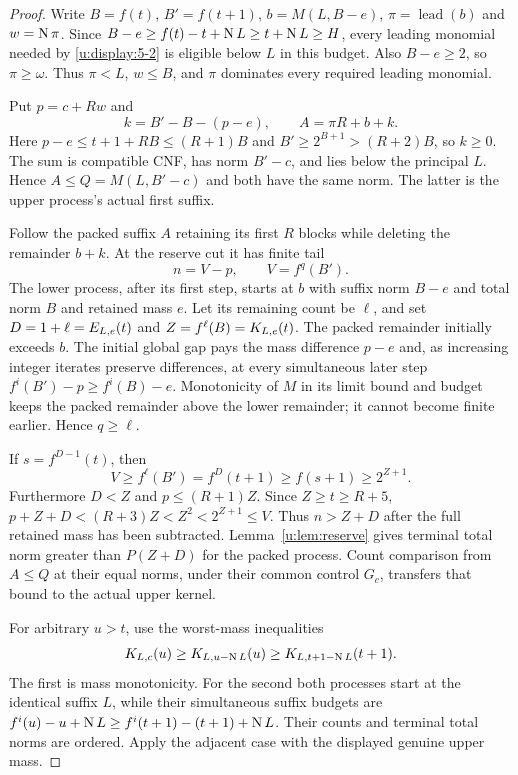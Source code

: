 \begin{proof}
Write $B=f(t)$, $B'=f(t+1)$, $b=M(L,B-e)$,
$\pi=\operatorname{lead}(b)$ and $w=\operatorname{N}\pi$. Since
$B-e\ge f(t)-t+\operatorname{N} L\ge t+\operatorname{N} L\ge H$, every leading monomial
needed by \eqref{u:display:5-2} is eligible below $L$ in this budget. Also $B-e\ge2$,
so $\pi\ge\omega$. Thus $\pi<L$, $w\le B$, and $\pi$ dominates
every required leading monomial.

Put $p=c+Rw$ and
\[
 k=B'-B-(p-e),\qquad A=\pi R+b+k.
\]
Here $p-e\le t+1+RB\le(R+1)B$ and
$B'\ge2^{B+1}>(R+2)B$, so $k\ge0$. The sum is compatible CNF,
has norm $B'-c$, and lies below the principal $L$. Hence
$A\le Q=M(L,B'-c)$ and both have the same norm. The latter is the
upper process's actual first suffix.

Follow the packed suffix $A$ retaining its first $R$ blocks while deleting
the remainder $b+k$. At the reserve cut it has finite tail
\begin{equation}
               n=V-p,\qquad V=f^q(B').              \label{u:display:6-3}
\end{equation}
The lower process, after its first step, starts at $b$ with suffix norm $B-e$ and total norm $B$
and retained mass $e$. Let its remaining count be $\ell$, and set
$D=1+\ell=E_{L,e}(t)$ and $Z=f^\ell(B)=K_{L,e}(t)$.
The packed remainder initially exceeds $b$. The initial global gap pays
the mass difference $p-e$ and, as increasing integer iterates preserve
differences, at every simultaneous later step
$f^i(B')-p\ge f^i(B)-e$. Monotonicity of $M$ in its limit bound and
budget keeps the packed remainder above the lower remainder; it cannot
become finite earlier. Hence $q\ge\ell$.

If $s=f^{D-1}(t)$, then
\[
 V\ge f^\ell(B')=f^D(t+1)\ge f(s+1)\ge2^{Z+1}.
\]
Furthermore $D<Z$ and $p\le(R+1)Z$. Since $Z\ge t\ge R+5$,
$p+Z+D<(R+3)Z<Z^2<2^{Z+1}\le V$. Thus $n>Z+D$ after the full
retained mass has been subtracted. Lemma~\ref{u:lem:reserve} gives terminal
total norm greater than $P(Z+D)$ for the packed process. Count comparison
from $A\le Q$ at their equal norms, under their common control $G_c$,
transfers that bound to the actual upper kernel.

For arbitrary $u>t$, use the worst-mass inequalities
\begin{equation}
 K_{L,c}(u)\ge K_{L,u-\operatorname{N} L}(u)
          \ge K_{L,t+1-\operatorname{N} L}(t+1).              \label{u:display:6-4}
\end{equation}
The first is mass monotonicity. For the second both processes start at
the identical suffix $L$, while their simultaneous suffix budgets are
$f^i(u)-u+\operatorname{N} L\ge f^i(t+1)-(t+1)+\operatorname{N} L$.
Their counts and terminal total norms are ordered. Apply the adjacent
case with the displayed genuine upper mass.
\end{proof}

